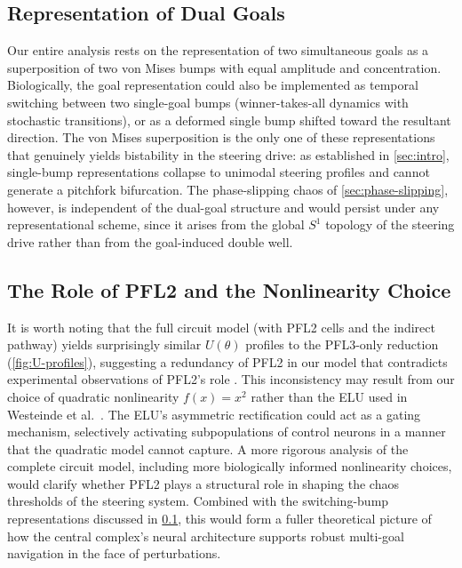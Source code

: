\documentclass[11pt, a4paper]{article}
\begin{document}
\subsection{Representation of Dual Goals}
\label{sec:dual-goal-rep}

Our entire analysis rests on the representation of two simultaneous goals as a
superposition of two von Mises bumps with equal amplitude and concentration.
Biologically, the goal representation could also be implemented as temporal
switching between two single-goal bumps (winner-takes-all dynamics with
stochastic transitions), or as a deformed single bump shifted toward the
resultant direction.  The von Mises superposition is the only one of these
representations that genuinely yields bistability in the steering drive: as
established in \cref{sec:intro}, single-bump representations collapse to
unimodal steering profiles and cannot generate a pitchfork bifurcation.  The
phase-slipping chaos of \cref{sec:phase-slipping}, however, is independent of
the dual-goal structure and would persist under any representational scheme,
since it arises from the global $S^1$ topology of the steering drive rather than
from the goal-induced double well.

\subsection{The Role of PFL2 and the Nonlinearity Choice}
\label{sec:pfl2}

It is worth noting that the full circuit model (with PFL2 cells and the indirect
pathway) yields surprisingly similar $U(\theta)$ profiles to the PFL3-only
reduction (\cref{fig:U-profiles}), suggesting a redundancy of PFL2 in our model
that contradicts experimental observations of PFL2's role
\cite{westeinde2024}.  This inconsistency may result from our choice of quadratic
nonlinearity $f(x) = x^2$ rather than the ELU used in Westeinde et al.\
\cite{westeinde2024}.  The ELU's asymmetric rectification could act as a gating
mechanism, selectively activating subpopulations of control neurons in a manner
that the quadratic model cannot capture.  A more rigorous analysis of the
complete circuit model, including more biologically informed nonlinearity choices,
would clarify whether PFL2 plays a structural role in shaping the chaos
thresholds of the steering system.  Combined with the switching-bump
representations discussed in \cref{sec:dual-goal-rep}, this would form a fuller
theoretical picture of how the central complex's neural architecture supports
robust multi-goal navigation in the face of perturbations.
\end{document}
